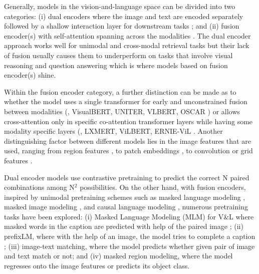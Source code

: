 \documentclass[10pt,twocolumn,letterpaper]{article}
\begin{document}
Generally, models in the vision-and-language space can be divided into two categories: (i) dual encoders where the image and text are encoded separately followed by a shallow interaction layer for downstream tasks \cite{radford2021learning,jia2021scaling}; and (ii) fusion encoder(s) with self-attention spanning across the modalities \cite{hu2020iterative,tan2019LXMERTLC,su2019vl,li2021albef, zhou2020unified, chen2020uniter, li2020oscar, li2021unimo, lu2019vilbert, li2019visualbert, lu202012, gan2020villa, zhang2021vinvl, wang2021simvlm, huang2021soho}. The dual encoder approach works well for unimodal \cite{wang2019glue, wang2019superglue} and cross-modal retrieval tasks \cite{flickr30k,coco} but their lack of fusion usually causes them to underperform on tasks that involve visual reasoning and question answering \cite{goyal2017making,kiela2020hateful,singh2019towards,sidorov2020textcaps} which is where models based on fusion encoder(s) shine.

Within the fusion encoder category, a further distinction can be made as to whether the model uses a single transformer for early and unconstrained fusion between modalities (\eg, VisualBERT, UNITER, VLBERT, OSCAR \cite{li2019visualbert, chen2020uniter, su2019vl, li2020oscar, zhou2020unified}) or allows cross-attention only in specific co-attention transformer layers while having some modality specific layers (\eg, LXMERT, ViLBERT, ERNIE-ViL \cite{tan2019LXMERTLC, lu2019vilbert, lu202012, yu2020ernie}. Another distinguishing factor between different models lies in the image features that are used, ranging from region features \cite{lu2019vilbert,li2019visualbert,zhang2021vinvl}, to patch embeddings \cite{li2021albef,kim2021vilt,wang2021simvlm}, to convolution or grid features \cite{huang2020pixelbert,jiang2020defense}.

Dual encoder models use contrastive pretraining to predict the correct N paired combinations among N$^2$ possibilities. On the other hand, with fusion encoders, inspired by unimodal pretraining schemes such as masked language modeling \cite{devlin2018bert, liu2019roberta}, masked image modeling \cite{bao2021beit}, and causal language modeling \cite{radford2018improving}, numerous pretraining tasks have been explored: (i) Masked Language Modeling (MLM) for V\&L where masked words in the caption are predicted with help of the paired image \cite{li2019visualbert, lu2019vilbert, tan2019LXMERTLC}; (ii) prefixLM, where with the help of an image, the model tries to complete a caption \cite{wang2021simvlm,desai2020virtex}; (iii) image-text matching, where the model predicts whether given pair of image and text match or not; and (iv) masked region modeling, where the model regresses onto the image features or predicts its object class.
\end{document}
